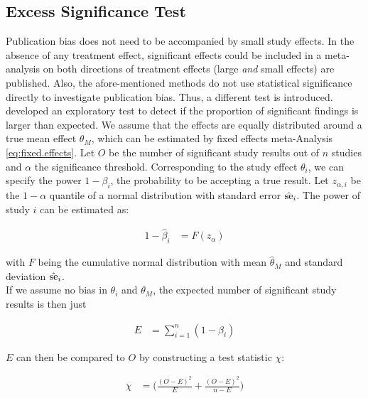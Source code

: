 \documentclass[11pt,a4paper,twoside]{book}\usepackage[]{graphicx}\usepackage[]{color}
\begin{document}
\subsection{Excess Significance Test} \label{sec:excess.significance}
Publication bias does not need to be accompanied by small study effects. In the absence of any treatment effect, significant effects could be included in a meta-analysis on both directions of treatment effects (\ie large \textit{and} small effects) are published. Also, the afore-mentioned methods do not use statistical significance directly to investigate publication bias. Thus, a different test is introduced. \\
\citealp{excess.significance} developed an exploratory test to detect if the proportion of significant findings is larger than expected. 
We assume that the effects are equally distributed around a true mean effect $\theta_M$, which can be estimated by fixed effects meta-Analysis \eqref{eq:fixed.effects}. Let $O$ be the number of significant study results out of $n$ studies and $\alpha$ the significance threshold. Corresponding to the study effect $\theta_i$, we can specify the power $1 - \beta_i$, the probability to be accepting a true result. Let $z_{\alpha,i}$ be the $1-\alpha$ quantile of a normal distribution with standard error $\hat{\operatorname{se}}_i$. The power of study $i$ can be estimated as:

\begin{align}
1 - \hat{\beta}_i &= F(z_\alpha) 
\end{align}

with $F$ being the cumulative normal distribution with mean $\hat{\theta}_M$ and standard deviation $\hat{\operatorname{se}}_i$. \\
If we assume no bias in $\theta_i$ and $\theta_M$, the expected number of significant study results is then just

\begin{align}
E &= \sum_{i = 1}^n (1 - \beta_i) \nonumber
\end{align}

$E$ can then be compared to $O$ by constructing a test statistic $\chi$:

\begin{align}
\chi  &= \bigg( \frac{(O - E)^2}{E} + \frac{(O - E)^2}{n - E}\bigg) \nonumber
\end{align}
\end{document}
